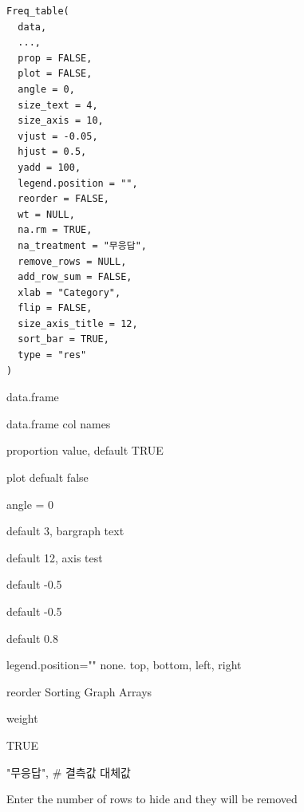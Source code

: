 \documentclass[a4paper]{book}
\begin{document}
%
\begin{Usage}
\begin{verbatim}
Freq_table(
  data,
  ...,
  prop = FALSE,
  plot = FALSE,
  angle = 0,
  size_text = 4,
  size_axis = 10,
  vjust = -0.05,
  hjust = 0.5,
  yadd = 100,
  legend.position = "",
  reorder = FALSE,
  wt = NULL,
  na.rm = TRUE,
  na_treatment = "무응답",
  remove_rows = NULL,
  add_row_sum = FALSE,
  xlab = "Category",
  flip = FALSE,
  size_axis_title = 12,
  sort_bar = TRUE,
  type = "res"
)
\end{verbatim}
\end{Usage}
%
\begin{Arguments}
\begin{ldescription}
\item[\code{data}] data.frame

\item[\code{...}] data.frame col names

\item[\code{prop}] proportion value, default TRUE

\item[\code{plot}] plot defualt false

\item[\code{angle}] angle = 0

\item[\code{size\_text}] default 3, bargraph text

\item[\code{size\_axis}] default 12, axis test

\item[\code{vjust}] default -0.5

\item[\code{hjust}] default -0.5

\item[\code{yadd}] default 0.8

\item[\code{legend.position}] legend.position="" none. top, bottom, left, right

\item[\code{reorder}] reorder Sorting Graph Arrays

\item[\code{wt}] weight

\item[\code{na.rm}] TRUE

\item[\code{na\_treatment}] "무응답", \# 결측값 대체값

\item[\code{remove\_rows}] Enter the number of rows to hide and they will be removed


\end{ldescription}
\end{Arguments}
\end{document}
